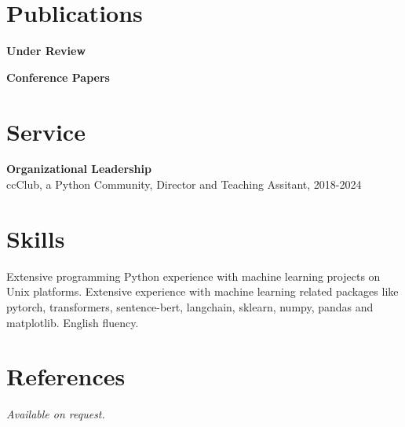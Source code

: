 \documentclass{article}
\begin{document}
\setlength{\leftmargini}{0em}
\section{Publications}
\vspace{\baselineskip}
\noindent\textbf{Under Review}\\
\begin{verse}
\end{verse}
\vspace{\baselineskip}
\noindent\textbf{Conference Papers}\\
\begin{verse}
\end{verse}
\begin{verse}
\end{verse}
\begin{verse}
\end{verse}
\vspace{1em}
\section{Service}
\noindent\textbf{Organizational Leadership}\\
ccClub, a Python Community, Director and Teaching Assitant, 2018-2024\\






\section{Skills}\noindent Extensive programming Python experience with machine learning projects on Unix platforms. Extensive experience with machine learning related packages like pytorch, transformers, sentence-bert, langchain, sklearn, numpy, pandas and matplotlib. English fluency.



\section{References}\noindent \emph{Available on request.}

\end{document}
